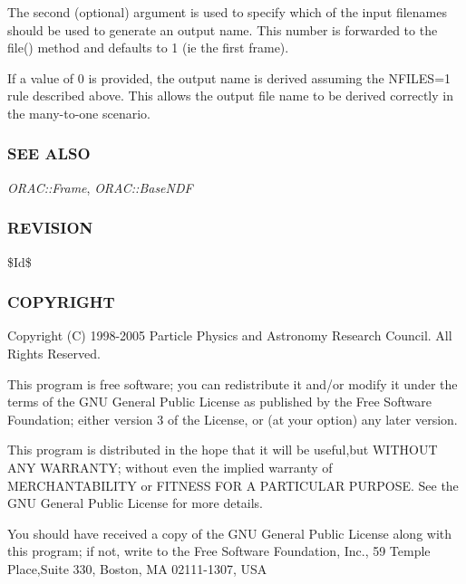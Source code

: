 \begin{description}
\begin{description}
\begin{description}
The second (optional) argument is used to specify which of the input
filenames should be used to generate an output name. This number is
forwarded to the file() method and defaults to 1 (ie the first frame).



If a value of 0 is provided, the output name is derived assuming the
NFILES=1 rule described above. This allows the output file name
to be derived correctly in the many-to-one scenario.

\end{description}
\subsubsection*{SEE ALSO\label{ORAC::Frame::NDF_SEE_ALSO}}


\emph{ORAC::Frame}, \emph{ORAC::BaseNDF}

\subsubsection*{REVISION\label{ORAC::Frame::NDF_REVISION}}


\$Id\$

\subsubsection*{COPYRIGHT\label{ORAC::Frame::NDF_COPYRIGHT}}


Copyright (C) 1998-2005 Particle Physics and Astronomy Research
Council. All Rights Reserved.



This program is free software; you can redistribute it and/or modify it under
the terms of the GNU General Public License as published by the Free Software
Foundation; either version 3 of the License, or (at your option) any later
version.



This program is distributed in the hope that it will be useful,but WITHOUT ANY
WARRANTY; without even the implied warranty of MERCHANTABILITY or FITNESS FOR A
PARTICULAR PURPOSE. See the GNU General Public License for more details.



You should have received a copy of the GNU General Public License along with
this program; if not, write to the Free Software Foundation, Inc., 59 Temple
Place,Suite 330, Boston, MA  02111-1307, USA


\end{description}
\end{description}
